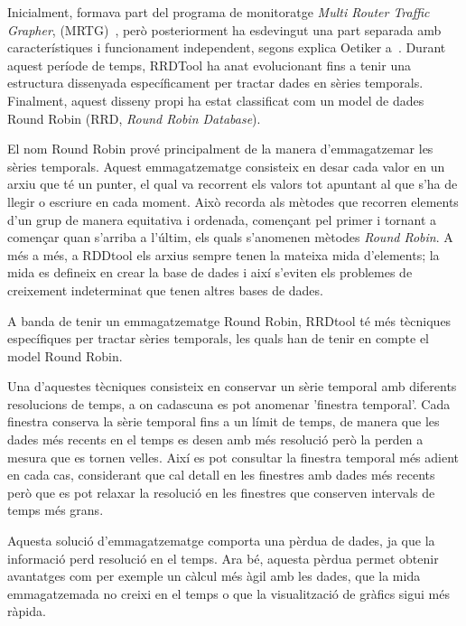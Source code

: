 Inicialment, formava part del programa de monitoratge \emph{Multi Router Traffic Grapher}, (MRTG)~\cite{mrtg}, però posteriorment ha esdevingut una part separada amb característiques i funcionament independent, segons explica Oetiker a~\cite{lisa98:oetiker}. Durant aquest període de temps, RRDTool ha anat evolucionant fins a tenir una estructura dissenyada específicament per tractar dades en sèries temporals. Finalment, aquest disseny propi ha estat classificat com un model de dades Round Robin (RRD, \emph{Round Robin Database}). 

El nom Round Robin prové principalment de la manera d'emmagatzemar les sèries temporals. Aquest emmagatzematge consisteix en desar cada valor en un arxiu que té un punter, el qual va recorrent els valors tot apuntant al que s'ha de llegir o escriure en cada moment. 
Això recorda als mètodes que recorren elements d'un grup de manera equitativa i ordenada, començant pel primer i tornant a començar quan s'arriba a l'últim, els quals s'anomenen mètodes \emph{Round Robin}. 
A més a més, a RDDtool els arxius sempre tenen la mateixa mida d'elements; la mida es defineix en crear la base de dades i així s'eviten els problemes de creixement indeterminat que tenen altres bases de dades.

A banda de tenir un emmagatzematge Round Robin, RRDtool té més tècniques específiques per tractar sèries temporals, les quals han de tenir en compte el model Round Robin.

Una d'aquestes tècniques consisteix en conservar un sèrie temporal amb diferents resolucions de temps, a on cadascuna es pot anomenar 'finestra temporal'. Cada finestra conserva la sèrie temporal fins a un límit de temps, de manera que les dades més recents en el temps es desen amb més resolució però la perden a mesura que es tornen velles. 
Així es pot consultar la finestra temporal més adient en cada cas, considerant que cal detall en les finestres amb dades més recents però que es pot relaxar la resolució en les finestres que conserven intervals de temps més grans.

Aquesta solució d'emmagatzematge comporta una pèrdua de dades, ja que la informació perd resolució en el temps. Ara bé, aquesta pèrdua permet obtenir avantatges com per exemple un càlcul més àgil amb les dades, que la mida emmagatzemada no creixi en el temps o que la visualització de gràfics sigui més ràpida.


